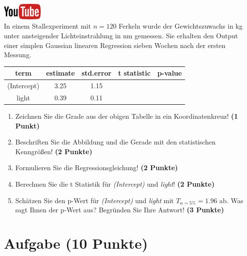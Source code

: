 \documentclass[a4paper, 9pt]{scrartcl}\usepackage[]{graphicx}\usepackage[]{xcolor}
\begin{document}
\hfill\href{https://youtu.be/lJp8rFmMnrs}{\includegraphics[width =
  2cm]{img/youtube}}\\[1Ex]



In einem Stallexperiment mit $n = 120$ Ferkeln wurde der
Gewichtszuwachs in kg unter ansteigender Lichteinstrahlung in nm
gemessen. Sie erhalten den \Rlogo Output einer simplen Gaussian linearen
Regression sieben Wochen nach der ersten Messung.

\begin{table}[!h]
\centering\begingroup\fontsize{14}{16}\selectfont

\begin{tabular}{ccccc}
\toprule
term & estimate & std.error & t statistic & p-value\\
\midrule
(Intercept) & 3.25 & 1.15 &  & \\
light & 0.39 & 0.11 &  & \\
\bottomrule
\end{tabular}
\endgroup{}
\end{table}



\begin{enumerate}
\item Zeichnen Sie die Grade aus der obigen Tabelle in ein Koordinatenkreuz! \textbf{(1 Punkt)}
\item Beschriften Sie die Abbildung und die Gerade mit den statistischen
  Kenngr{\"o}{\ss}en! \textbf{(2 Punkte)}
\item Formulieren Sie die Regressionsgleichung! \textbf{(2 Punkte)}
\item Berechnen Sie die t Statistik f{\"u}r \textit{(Intercept)} und
  \textit{light}! \textbf{(2 Punkte)}
\item Sch{\"a}tzen Sie den p-Wert f{\"u}r \textit{(Intercept)} und
  \textit{light} mit $T_{\alpha = 5\%} = 1.96$ ab. Was sagt Ihnen der p-Wert aus?
  Begr{\"u}nden Sie Ihre Antwort! \textbf{(3 Punkte)}
\end{enumerate} 
\clearpage

\section{Aufgabe \hfill (10 Punkte)}
\end{document}
